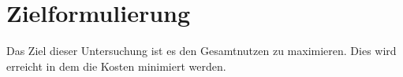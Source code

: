 %
%
%
%

\chapter{Zielformulierung}
\label{chap:Zielf}

Das Ziel dieser Untersuchung ist es den Gesamtnutzen zu maximieren. Dies wird erreicht in dem die Kosten minimiert werden. \\

\blindtext


%

